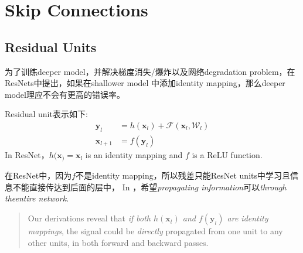 \chapter{Skip Connections}

\section{Residual Units}
为了训练deeper model，并解决梯度消失/爆炸以及网络degradation problem，在ResNets\cite{He2016resnet}中提出，如果在shallower model
中添加identity mapping，那么deeper model理应不会有更高的错误率。
\par
Residual unit表示如下:
\begin{equation}
    \begin{split}
        \mathbf{y}_l &= h(\mathbf{x}_l) + \mathcal{F}(\mathbf{x}_l, \mathcal{W}_l) \\
        \mathbf{x}_{l+1} &= f(\mathbf{y}_l)
    \end{split}
\end{equation}
In ResNet，$h(\mathbf{x}_) = \mathbf{x}_l$ is an identity mapping and $f$ is a ReLU function.
\par
在ResNet中，因为$f$不是identity mapping，所以残差只能ResNet units中学习且信息不能直接传达到后面的层中，
In \cite{He2016identity}，希望\textit{propagating information}可以\textit{through theentire network}.
\begin{quotation}
    Our derivations reveal that \textit{if both $h(\mathbf{x}_l)$ and
$f(\mathbf{y}_l)$ are identity mappings}, the signal could be \textit{directly} 
propagated from one unit to any other units, in both forward and backward passes.\cite{He2016identity}
\end{quotation}

